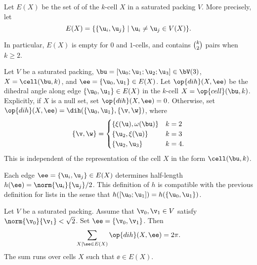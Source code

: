 
\begin{definition}[edge]
  Let $E(X)$ be the set of  of the $k$-cell
  $X$ in a saturated packing $V$.  More precisely, let
\begin{displaymath}E(X)=\{\{ \u_i, \u_j\}\mid \u_i\ne \u_j\in
V( X)\}.\end{displaymath}
%
\end{definition}

In particular, $E(X)$ is empty for $0$ and $1$-cells, and contains
$\tbinom{k}{2}$ pairs when $k\ge 2$.

\begin{definition}[$\op{dih}$] 
Let $V$ be a saturated packing, 
$\bu=[\u_0;\u_1;\u_2;\u_3]\in \bV(3)$, $X=\cell(\bu,k)$,
and $\ee=\{\u_0,\u_1\}\in E(X)$.
Let $\op{dih}(X,\ee)$ be the dihedral angle
along edge $\{\u_0,\u_1\}\in
E(X)$ in the $k$-cell $X = \op{cell}(\bu,k)$.
Explicitly, if $X$ is a null set, set $\op{dih}(X,\ee)=0$.  Otherwise,
set $\op{dih}(X,\ee)=\dih(\{\u_0,\u_1\},\{\v,\w\})$,
where 
\[
\{\v,\w\} = 
\begin{cases}
  \{\xi(\u),\omega(\bu) \} &  k=2\\
  \{\u_2,\xi(\u)\} & k=3\\
  \{\u_2,\u_3\} &k=4.
\end{cases}
\]
This is independent of the representation of the cell $X$ in the
form $\cell(\bu,k)$.
%
%
\end{definition}

Each
edge $\ee=\{ \u_i, \u_j\}\in E(X)$ determines half-length
$h(\ee) = \norm{ \u_i}{ \u_j}/2$.
This definition of $h$ is compatible with the previous definition for lists in the sense that
$h([\u_0;\u_1]) = h(\{\u_0,\u_1\})$.

\begin{lemma}
Let $V$ be a saturated packing.  Assume that $\v_0,\v_1\in V$ satisfy $\norm{\v_0}{\v_1}<\sqrt2$.  Set $\ee=\{\v_0,\v_1\}$.
Then
\[
\sum_{X\mid \ee\in E(X) } \op{dih}(X,\ee) = 2\pi.
\]
The sum runs over cells $X$ such that $\ee\in E(X)$.
\end{lemma}

